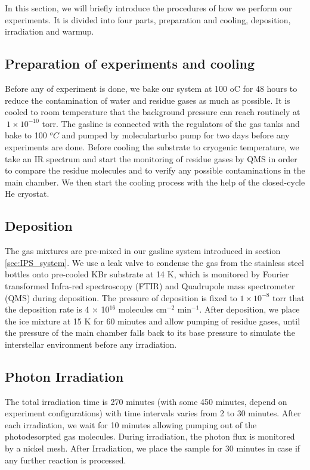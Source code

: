 In this section, we will briefly introduce the  procedures of how we perform our experiments. It is divided into four parts, preparation and cooling, deposition, irradiation and warmup.

\subsection{Preparation of experiments and cooling}
Before any of experiment is done, we bake our system at 100 oC for 48 hours to reduce the contamination of water and residue gases as much as possible. It is cooled to room temperature that the background pressure can reach routinely at $~ 1 \times 10^{-10}$ torr. The gasline is connected with the regulators of the gas tanks and bake to 100 $^oC$ and pumped by molecularturbo pump for two days before any experiments are done. Before cooling the substrate to cryogenic temperature, we take an IR spectrum and start the monitoring of residue gases by QMS in order to compare the residue molecules and to verify any possible contaminations in the main chamber. We then start the cooling process with the help of the closed-cycle He cryostat.

\subsection{Deposition}
The gas mixtures are pre-mixed in our gasline system introduced in section \ref{sec:IPS_system}. We use a leak valve to condense the gas from the stainless steel bottles onto pre-cooled KBr substrate at 14 K, which is monitored by Fourier transformed Infra-red spectroscopy (FTIR) and Quadrupole mass spectrometer (QMS) during deposition. The pressure of deposition is fixed to $1 \times 10^{-8}$ torr that the deposition rate is 4 $\times$ 10$^{16}$ molecules cm$^{-2}$ min$^{-1}$. After deposition, we place the ice mixture at 15 K for 60 minutes and allow pumping of residue gases, until the pressure of the main chamber falls back to its base pressure to simulate the interstellar environment before any irradiation.

\subsection{Photon Irradiation}
The total irradiation time is 270 minutes (with some 450 minutes, depend on experiment configurations) with time intervals varies from 2 to 30 minutes. After each irradiation, we wait for 10 minutes allowing pumping out of the photodesorpted gas molecules. During irradiation, the photon flux is monitored by a nickel mesh. After Irradiation, we place the sample for 30 minutes in case if any further reaction is processed.

